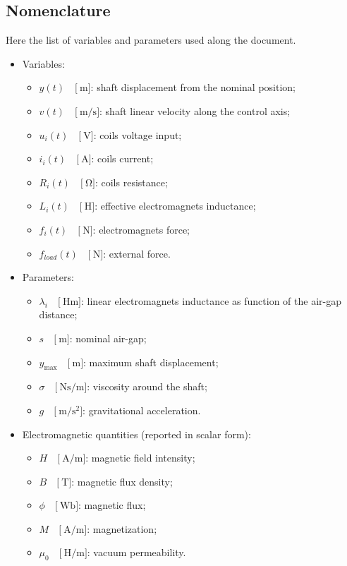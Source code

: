 \documentclass[12pt,a4paper,oneside]{book}
\begin{document}
\begin{onehalfspace}
\subsection{Nomenclature}	
Here the list of variables and parameters used along the document.
\begin{itemize}
	\item[--] Variables:
	\begin{itemize}
		\item[--] $y(t)\quad\Big[\SI{}{\meter}\Big]$: shaft displacement from the nominal position;
		\item[--] $v(t)\quad\Big[\SI{}{\meter\per\second}\Big]$: shaft linear velocity along the control axis;
		\item[--] $u_i(t)\quad\Big[\SI{}{\volt}\Big]$: coils voltage input;
		\item[--] $i_{i}(t)\quad\Big[\SI{}{\ampere}\Big]$: coils current;
		\item[--] $R_{i}(t)\quad\Big[\SI{}{\ohm}\Big]$: coils resistance;
		\item[--] $L_{i}(t)\quad\Big[\SI{}{\henry}\Big]$: effective electromagnets inductance;
		\item[--] $f_i(t)\quad\Big[\SI{}{\newton}\Big]$: electromagnets force;
		\item[--] $f_{load}(t)\quad\Big[\SI{}{\newton}\Big]$: external force.
	\end{itemize}
	\item[--] Parameters:
	\begin{itemize}
		\item[--] $\lambda_{i}\quad\Big[\SI{}{\henry\meter}\Big]$: linear electromagnets inductance as function of the air-gap distance;
		\item[--] $s\quad\Big[\SI{}{\meter}\Big]$: nominal air-gap;
		\item[--] $y_{\max}\quad\Big[\SI{}{\meter}\Big]$: maximum shaft displacement;
		\item[--] $\sigma\quad\Big[\SI{}{\newton\second\per\meter}\Big]$: viscosity around the shaft;
		\item[--] $g\quad\Big[\SI{}{\meter\per\square\second}\Big]$: gravitational acceleration.
	\end{itemize}
	\item[--] Electromagnetic quantities (reported in scalar form):
	\begin{itemize}
		\item[--] $H\quad\Big[\SI{}{\ampere\per\meter}\Big]$: magnetic field intensity;
		\item[--] $B\quad\Big[\SI{}{\tesla}\Big]$: magnetic flux density;
		\item[--] $\phi\quad\Big[\SI{}{\weber}\Big]$: magnetic flux;
		\item[--] $M\quad\Big[\SI{}{\ampere\per\meter}\Big]$: magnetization;
		\item[--] $\mu_0\quad\Big[\SI{}{\henry\per\meter}\Big]$: vacuum permeability.
	\end{itemize}
\end{itemize}


\end{onehalfspace}
\end{document}
